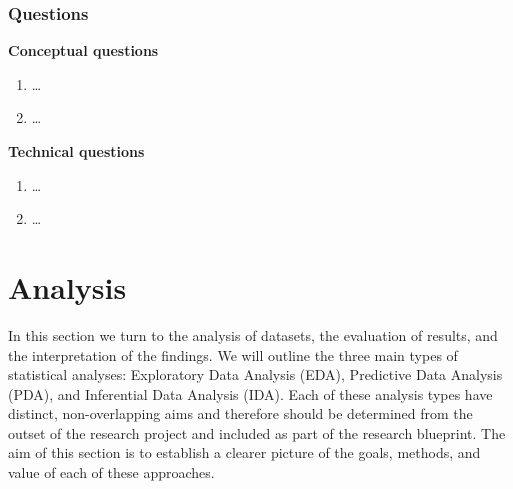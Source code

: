 \documentclass[
  letterpaper,
  DIV=11,
  numbers=noendperiod]{scrreport}
\providecommand{\tightlist}{%
  \setlength{\itemsep}{0pt}\setlength{\parskip}{0pt}}\usepackage{longtable,booktabs,array}
\theoremstyle{definition}
\theoremstyle{remark}
\begin{document}
\hypertarget{questions-6}{%
\section*{Questions}\label{questions-6}}


\begin{tcolorbox}[enhanced jigsaw, breakable, colback=white, rightrule=.15mm, arc=.35mm, left=2mm, toprule=.15mm, leftrule=.75mm, bottomrule=.15mm, opacityback=0]

 \textbf{Conceptual questions}

\begin{enumerate}
\def\labelenumi{\arabic{enumi}.}
\tightlist
\item
  \ldots{}
\item
  \ldots{}
\end{enumerate}

\end{tcolorbox}

\begin{tcolorbox}[enhanced jigsaw, breakable, colback=white, rightrule=.15mm, arc=.35mm, left=2mm, toprule=.15mm, leftrule=.75mm, bottomrule=.15mm, opacityback=0]

 \textbf{Technical questions}

\begin{enumerate}
\def\labelenumi{\arabic{enumi}.}
\tightlist
\item
  \ldots{}
\item
  \ldots{}
\end{enumerate}

\end{tcolorbox}

\part{Analysis}

In this section we turn to the analysis of datasets, the evaluation of
results, and the interpretation of the findings. We will outline the
three main types of statistical analyses: Exploratory Data Analysis
(EDA), Predictive Data Analysis (PDA), and Inferential Data Analysis
(IDA). Each of these analysis types have distinct, non-overlapping aims
and therefore should be determined from the outset of the research
project and included as part of the research blueprint. The aim of this
section is to establish a clearer picture of the goals, methods, and
value of each of these approaches.
\end{document}

